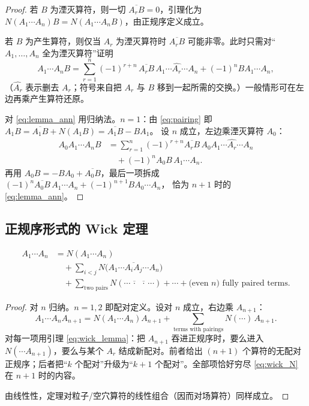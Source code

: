 \begin{proof}
若 $B$ 为湮灭算符，则一切 $\overline{A_r B}=0$，引理化为
$N(A_1\cdots A_n)B=N(A_1\cdots A_n B)$，由正规序定义成立。

若 $B$ 为产生算符，则仅当 $A_r$ 为湮灭算符时 $\overline{A_r B}$ 可能非零。此时只需对“$A_1,\ldots,A_n$ 全为湮灭算符”证明
\begin{equation}
  A_1\cdots A_n B
  =\sum_{r=1}^n
  (-1)^{r+n}\,\overline{A_r B}\,
  A_1\cdots\widehat{A_r}\cdots A_n
  +(-1)^n B A_1\cdots A_n,
\label{eq:lemma_ann}
\end{equation}
（$\widehat{A_r}$ 表示删去 $A_r$；符号来自把 $A_r$ 与 $B$ 移到一起所需的交换。）一般情形可在左边再乘产生算符还原。

对 \eqref{eq:lemma_ann} 用归纳法。$n=1$：由 \eqref{eq:pairing} 即
$A_1 B=\overline{A_1 B}+N(A_1 B)=\overline{A_1 B}-B A_1$。
设 $n$ 成立，左边乘湮灭算符 $A_0$：
\begin{equation}
\begin{aligned}
  A_0 A_1\cdots A_n B
  &=\sum_{r=1}^n(-1)^{r+n}\overline{A_r B}\,
  A_0 A_1\cdots\widehat{A_r}\cdots A_n\\
  &\quad+(-1)^n A_0 B\,A_1\cdots A_n.
\end{aligned}
\end{equation}
再用 $A_0 B=-B A_0+\overline{A_0 B}$，最后一项拆成
$(-1)^n\overline{A_0 B}\,A_1\cdots A_n+(-1)^{n+1}B A_0\cdots A_n$，
恰为 $n+1$ 时的 \eqref{eq:lemma_ann}。
\end{proof}

\subsection{正规序形式的 Wick 定理}

\begin{theorem}
\begin{equation}
\begin{aligned}
  A_1\cdots A_n
  &=N(A_1\cdots A_n)\\
  &\quad+\sum_{i<j}
  N\bigl(A_1\cdots\overline{A_i A_j}\cdots A_n\bigr)\\
  &\quad+\sum_{\text{two pairs}}
  N(\cdots\overline{\,\cdot\,}\,\overline{\,\cdot\,}\cdots)
  +\cdots
  +\text{(even $n$) fully paired terms}.
\end{aligned}
\label{eq:wick_N}
\end{equation}
\end{theorem}

\begin{proof}
对 $n$ 归纳。$n=1,2$ 即配对定义。设对 $n$ 成立，右边乘 $A_{n+1}$：
\begin{equation}
  A_1\cdots A_n A_{n+1}
  =N(A_1\cdots A_n)A_{n+1}
  +\sum_{\text{terms with pairings}}N(\cdots)\,A_{n+1}.
\end{equation}
对每一项用引理 \eqref{eq:wick_lemma}：把 $A_{n+1}$ 吞进正规序时，要么进入 $N(\cdots A_{n+1})$，要么与某个 $A_r$ 结成新配对。前者给出 $(n+1)$ 个算符的无配对正规序；后者把“$k$ 个配对”升级为“$k+1$ 个配对”。全部项恰好穷尽 \eqref{eq:wick_N} 在 $n+1$ 时的内容。

由线性性，定理对粒子/空穴算符的线性组合（因而对场算符）同样成立。
\end{proof}

